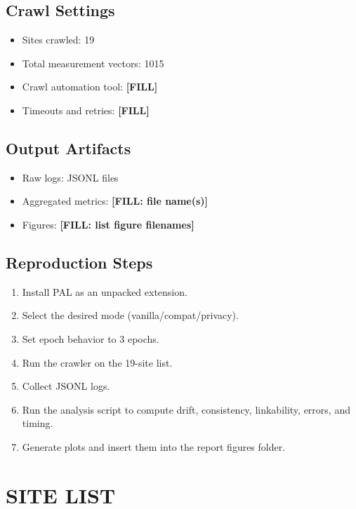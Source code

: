 \documentclass[11pt]{report}
\begin{document}
\section{Crawl Settings}

\begin{itemize}
    \item Sites crawled: 19
    \item Total measurement vectors: 1015
    \item Crawl automation tool: \textbf{[FILL]}
    \item Timeouts and retries: \textbf{[FILL]}
\end{itemize}

\section{Output Artifacts}

\begin{itemize}
    \item Raw logs: JSONL files
    \item Aggregated metrics: \textbf{[FILL: file name(s)]}
    \item Figures: \textbf{[FILL: list figure filenames]}
\end{itemize}

\section{Reproduction Steps}

\begin{enumerate}
    \item Install PAL as an unpacked extension.
    \item Select the desired mode (vanilla/compat/privacy).
    \item Set epoch behavior to 3 epochs.
    \item Run the crawler on the 19-site list.
    \item Collect JSONL logs.
    \item Run the analysis script to compute drift, consistency, linkability, errors, and timing.
    \item Generate plots and insert them into the report figures folder.
\end{enumerate}

\chapter{SITE LIST}
\end{document}
